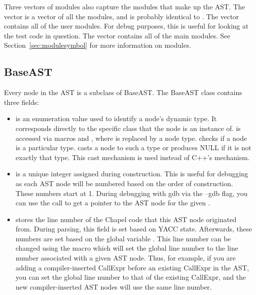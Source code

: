 \documentclass[10pt]{article}
\begin{document}
Three vectors of modules also capture the modules that make up the
AST.  The vector  is a vector of all the modules, and
is probably identical to .  The vector
 contains all of the user modules.  For debug
purposes, this is useful for looking at the test code in question.
The vector  contains all of the main modules.  See
Section~\ref{sec:modulesymbol} for more information on modules.

\subsection{BaseAST}

Every node in the AST is a subclass of BaseAST.  The BaseAST class
contains three fields:
\begin{itemize}
\item {} is an enumeration value used to identify a
  node's dynamic type. It corresponds directly to the specific class
  that the node is an instance of.   is accessed via macros
   and , where  is replaced by a node
  type.   checks if a node is a particular type.  
  casts a node to such a type or produces NULL if it is not exactly
  that type.  This cast mechanism is used instead of C++'s
   mechanism.

\item {} is a unique integer assigned during construction.
  This is useful for debugging as each AST node will be numbered based
  on the order of construction.  These numbers start at 1.  During
  debugging with gdb via the --gdb flag, you can use the call 
  to get a pointer to the AST node for the given .

\item {} stores the line number of the Chapel code that
  this AST node originated from.  During parsing, this field is set
  based on YACC state.  Afterwards, these numbers are set based on the
  global variable .  This line number can be changed
  using the macro  which will set the global line
  number to the line number associated with a given AST node.  Thus,
  for example, if you are adding a compiler-inserted CallExpr before
  an existing CallExpr in the AST, you can set the global line number
  to that of the existing CallExpr, and the new compiler-inserted AST
  nodes will use the same line number.
\end{itemize}
\end{document}

